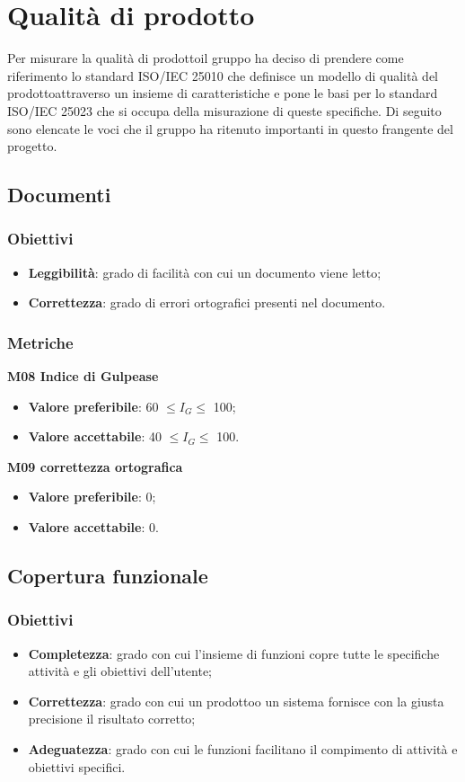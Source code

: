 \section{Qualità di prodotto}
    Per misurare la qualità di prodotto\glosp il gruppo ha deciso di prendere come riferimento lo standard ISO/IEC 25010 che definisce un modello di qualità del prodotto\glosp attraverso un insieme di caratteristiche e pone le basi per lo standard ISO/IEC 25023 che si occupa della misurazione di queste specifiche. Di seguito sono elencate le voci che il gruppo ha ritenuto importanti in questo frangente del progetto\glo.
    \subsection{Documenti}
    	\subsubsection{Obiettivi}
    		\begin{itemize}
    			\item \textbf{Leggibilità}: grado di facilità con cui un documento viene letto;
    			\item \textbf{Correttezza}: grado di errori ortografici presenti nel documento.
    		\end{itemize}
	    \subsubsection{Metriche}
	    \textbf{M08 Indice di Gulpease}
	    \begin{itemize}
	    	\item \textbf{Valore preferibile}: 60 $\le I_{G} \le$ 100;
	    	\item \textbf{Valore accettabile}: 40 $\le I_{G} \le$ 100.
	    \end{itemize}
	    \textbf{M09 correttezza ortografica}
	    \begin{itemize}
	    	\item \textbf{Valore preferibile}: 0;
	    	\item \textbf{Valore accettabile}: 0.
	    \end{itemize}
    \subsection{Copertura funzionale}
        \subsubsection{Obiettivi}
            \begin{itemize}
                \item \textbf{Completezza}: grado con cui l'insieme di funzioni copre tutte le specifiche attività e gli obiettivi dell'utente;
                \item \textbf{Correttezza}: grado con cui un prodotto\glosp o un sistema fornisce con la giusta precisione il risultato corretto;
                \item \textbf{Adeguatezza}: grado con cui le funzioni facilitano il compimento di attività e obiettivi specifici.
            \end{itemize}
